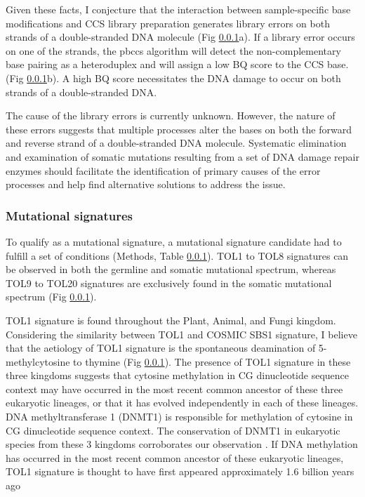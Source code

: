 Given these facts, I conjecture that the interaction between sample-specific base modifications and CCS library preparation generates library errors on both strands of a double-stranded DNA molecule (Fig \ref{}a). If a library error occurs on one of the strands, the pbccs algorithm will detect the non-complementary base pairing as a heteroduplex and will assign a low BQ score to the CCS base. (Fig \ref{}b). A high BQ score necessitates the DNA damage to occur on both strands of a double-stranded DNA. 

The cause of the library errors is currently unknown. However, the nature of these errors suggests that multiple processes alter the bases on both the forward and reverse strand of a double-stranded DNA molecule. Systematic elimination and examination of somatic mutations resulting from a set of DNA damage repair enzymes should facilitate the identification of primary causes of the error processes and help find alternative solutions to address the issue. 



\subsubsection{Mutational signatures}

To qualify as a mutational signature, a mutational signature candidate had to fulfill a set of conditions (Methods, Table \ref{}). TOL1 to TOL8 signatures can be observed in both the germline and somatic mutational spectrum, whereas TOL9 to TOL20 signatures are exclusively found in the somatic mutational spectrum (Fig \ref{}). 

TOL1 signature is found throughout the Plant, Animal, and Fungi kingdom. Considering the similarity between TOL1 and COSMIC SBS1 signature, I believe that the aetiology of TOL1 signature is the spontaneous deamination of 5-methylcytosine to thymine (Fig \ref{}). The presence of TOL1 signature in these three kingdoms suggests that cytosine methylation in CG dinucleotide sequence context may have occurred in the most recent common ancestor of these three eukaryotic lineages, or that it has evolved independently in each of these lineages. DNA methyltransferase 1 (DNMT1) is responsible for methylation of cytosine in CG dinucleotide sequence context. The conservation of DNMT1 in eukaryotic species from these 3 kingdoms corroborates our observation \cite{}. If DNA methylation has occurred in the most recent common ancestor of these eukaryotic lineages, TOL1 signature is thought to have first appeared approximately 1.6 billion years ago \cite{}

